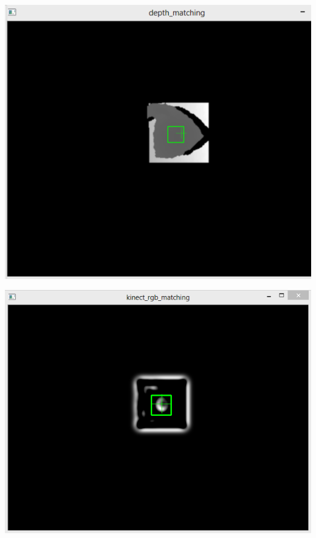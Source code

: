 \begin{center}
	\includegraphics[scale=0.7]{images/good_kinect_depth_matching.png}
\end{center}

\begin{center}
	\includegraphics[scale=0.7]{images/good_kinect_rgb_matching.png}
\end{center}

